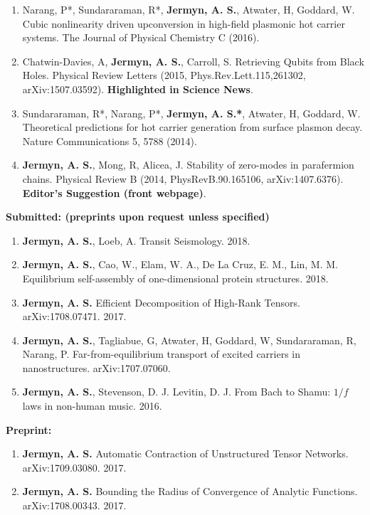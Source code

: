 \documentclass[line, margin]{res3address}
\begin{document}
\begin{resume}
\begin{enumerate}[leftmargin=10pt]
\item Narang, P*, Sundararaman, R*, \textbf{Jermyn, A. S.}, Atwater, H, Goddard, W. Cubic nonlinearity driven upconversion in high-field plasmonic hot carrier systems. The Journal of Physical Chemistry C (2016).
\item Chatwin-Davies, A, \textbf{Jermyn, A. S.}, Carroll, S. Retrieving Qubits from Black Holes. Physical Review Letters (2015, Phys.Rev.Lett.115,261302, arXiv:1507.03592). \textbf{Highlighted in Science News}.
\item Sundararaman, R*, Narang, P*, \textbf{Jermyn, A. S.*}, Atwater, H, Goddard, W. Theoretical predictions for hot carrier generation from surface plasmon decay. Nature Communications 5, 5788 (2014).
\item\textbf{Jermyn, A. S.}, Mong, R, Alicea, J. Stability of zero-modes in parafermion chains. Physical Review B (2014, PhysRevB.90.165106, arXiv:1407.6376). \textbf{Editor's Suggestion (front webpage)}.
\end{enumerate}

\textbf{Submitted: (preprints upon request unless specified)}
\begin{enumerate}[leftmargin=10pt]
\item \textbf{Jermyn, A. S.}, Loeb, A. Transit Seismology. 2018.
\item \textbf{Jermyn, A. S.}, Cao, W., Elam, W. A., De La Cruz, E. M., Lin, M. M. Equilibrium self-assembly of one-dimensional protein structures. 2018.
\item \textbf{Jermyn, A. S.} Efficient Decomposition of High-Rank Tensors. arXiv:1708.07471. 2017.
\item \textbf{Jermyn, A. S.}, Tagliabue, G, Atwater, H, Goddard, W, Sundararaman, R, Narang, P. Far-from-equilibrium transport of excited carriers in nanostructures. arXiv:1707.07060.
\item \textbf{Jermyn, A. S.}, Stevenson, D. J. Levitin, D. J. From Bach to Shamu: $1/f$ laws in non-human music. 2016.
\end{enumerate}

\textbf{Preprint:}
\begin{enumerate}[leftmargin=10pt]
\item \textbf{Jermyn, A. S.} Automatic Contraction of Unstructured Tensor Networks. arXiv:1709.03080. 2017.
\item \textbf{Jermyn, A. S.} Bounding the Radius of Convergence of Analytic Functions. arXiv:1708.00343. 2017.
\end{enumerate}


\end{resume}
\end{document}
